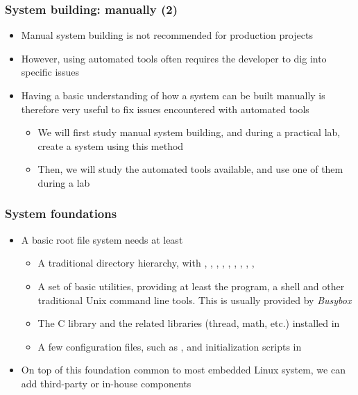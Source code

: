 \begin{frame}
  \frametitle{System building: manually (2)}
  \begin{itemize}
  \item Manual system building is not recommended for production
    projects
  \item However, using automated tools often requires the developer to
    dig into specific issues
  \item Having a basic understanding of how a system can be built
    manually is therefore very useful to fix issues encountered with
    automated tools
    \begin{itemize}
    \item We will first study manual system building, and during a
      practical lab, create a system using this method
    \item Then, we will study the automated tools available, and use
      one of them during a lab
    \end{itemize}
  \end{itemize}
\end{frame}

\begin{frame}
  \frametitle{System foundations}
  \begin{itemize}
  \item A basic root file system needs at least
    \begin{itemize}
    \item A traditional directory hierarchy, with ,
      , , , ,
      , , ,
      , 
    \item A set of basic utilities, providing at least the 
      program, a shell and other traditional Unix command line
      tools. This is usually provided by {\em Busybox}
    \item The C library and the related libraries (thread, math, etc.)
      installed in 
    \item A few configuration files, such as , and
      initialization scripts in 
    \end{itemize}
  \item On top of this foundation common to most embedded Linux
    system, we can add third-party or in-house components
  \end{itemize}
\end{frame}

